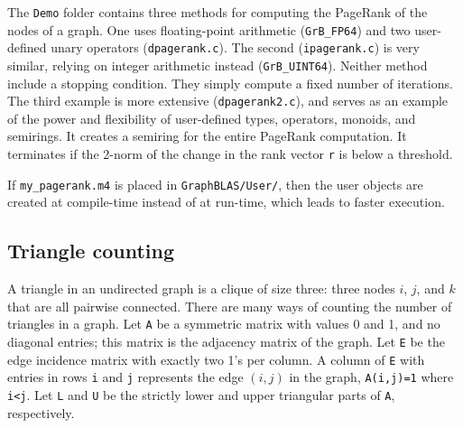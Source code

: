 \documentclass[12pt]{article}
\begin{document}
The \verb'Demo' folder contains three methods for computing the PageRank of the
nodes of a graph.  One uses floating-point arithmetic (\verb'GrB_FP64') and two
user-defined unary operators (\verb'dpagerank.c').  The second
(\verb'ipagerank.c') is very similar, relying on integer arithmetic instead
(\verb'GrB_UINT64').  Neither method include a stopping condition.  They simply
compute a fixed number of iterations.  The third example is more extensive
(\verb'dpagerank2.c'), and serves as an example of the power and flexibility of
user-defined types, operators, monoids, and semirings.  It creates a semiring
for the entire PageRank computation.  It terminates if the 2-norm of the change
in the rank vector \verb'r' is below a threshold.


If \verb'my_pagerank.m4' is placed in \verb'GraphBLAS/User/', then
the user objects are created at compile-time instead of at run-time, which
leads to faster execution.

\newpage
\subsection{Triangle counting}
\label{triangle}

A triangle in an undirected graph is a clique of size three:  three nodes $i$,
$j$, and $k$ that are all pairwise connected.  There are many ways of counting
the number of triangles in a graph.  Let \verb'A' be a symmetric matrix with
values 0 and 1, and no diagonal entries; this matrix is the adjacency matrix of
the graph.  Let \verb'E' be the edge incidence matrix with exactly two 1's per
column.  A column of \verb'E' with entries in rows \verb'i' and \verb'j'
represents the edge $(i,j)$ in the graph, \verb'A(i,j)=1' where \verb'i<j'.
Let \verb'L' and \verb'U' be the strictly lower and upper triangular parts of
\verb'A', respectively.
\end{document}
